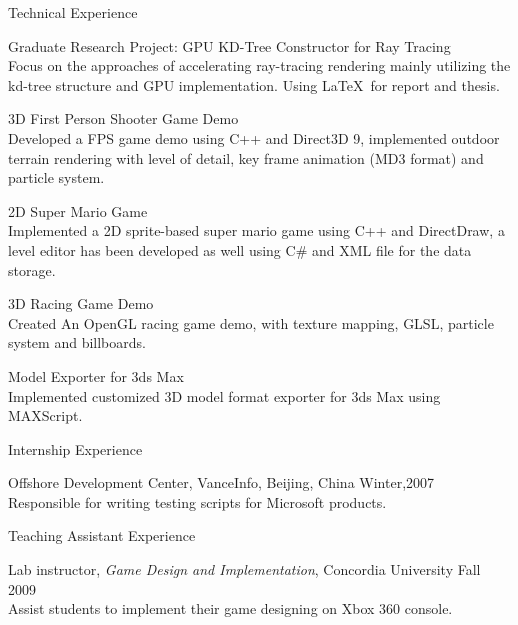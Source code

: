 \documentclass[10pt]{article}
\newenvironment{mydescription}{%
    \begin{description}
        \setlength{\itemsep}{0.25em}%
        \setlength{\parsep}{0em}%
        \setlength{\topsep}{\itemsep}%
        \setlength{\parskip}{0em}%
        \setlength{\labelwidth}{0.1em}
        \setlength{\labelsep}{0em} 
    }%
{\end{description}}
\begin{document}
\begin{cv}
\begin{cvlist}{Technical Experience}
\begin{mydescription}
        \item[Graduate Research Project: GPU KD-Tree Constructor for Ray Tracing] \hfill \\
            Focus on the approaches of accelerating ray-tracing rendering mainly utilizing the kd-tree structure and GPU implementation. Using \LaTeX\ for report and thesis.

        \item[3D First Person Shooter Game Demo] \hfill \\
            Developed a FPS game demo using C++ and Direct3D 9, implemented outdoor terrain rendering with level of detail, key frame animation (MD3 format) and particle system.

        \item[2D Super Mario Game] \hfill \\
            Implemented a 2D sprite-based super mario game using C++ and DirectDraw, a level editor has been developed as well using C\# and XML file for the data storage.

        \item[3D Racing Game Demo] \hfill \\ 
            Created An OpenGL racing game demo, with texture mapping, GLSL, particle system and billboards.


        \item[Model Exporter for 3ds Max] \hfill \\
            Implemented customized 3D model format exporter for 3ds Max using MAXScript.
    \end{mydescription}
\end{cvlist}

\begin{cvlist}{Internship Experience}
\item 
    \begin{mydescription}
        \item[Offshore Development Center, VanceInfo, Beijing, China] \hfill Winter,2007 \\ 
            Responsible for writing testing scripts for Microsoft products. 
    \end{mydescription}
\end{cvlist}

\begin{cvlist}{Teaching Assistant Experience}
\item
    \begin{mydescription}
        \item[Lab instructor, \emph{Game Design and Implementation}, Concordia University] \hfill Fall 2009\\
            Assist students to implement their game designing on Xbox 360 console. 


\end{mydescription}
\end{cvlist}
\end{cv}
\end{document}

